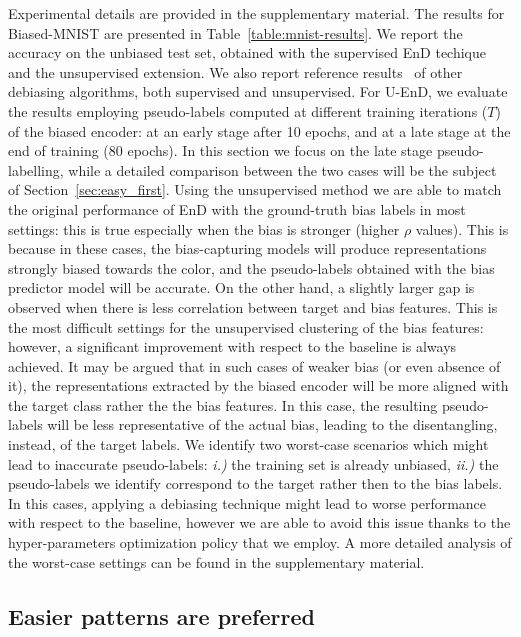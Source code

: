 Experimental details are provided in the supplementary material. %
The results for Biased-MNIST are presented in Table~\ref{table:mnist-results}. We report the accuracy on the unbiased test set, obtained with the supervised EnD techique and the unsupervised extension. We also report reference results~\cite{bahng2019rebias} of other debiasing algorithms, both supervised and unsupervised. 
For U-EnD, we evaluate the results employing pseudo-labels computed at different training iterations ($T$) of the biased encoder: at an early stage after 10 epochs, and at a late stage at the end of training (80 epochs). In this section we focus on the late stage pseudo-labelling, while a detailed comparison between the two cases will be the subject of Section~\ref{sec:easy_first}.
Using the unsupervised method we are able to match the original performance of EnD with the ground-truth bias labels in most settings: this is true especially when the bias is stronger (higher $\rho$ values). This is because in these cases, the bias-capturing models will produce representations strongly biased towards the color, and the pseudo-labels obtained with the bias predictor model will be accurate. On the other hand, a slightly larger gap is observed when there is less correlation between target and bias features. 
This is the most difficult settings for the unsupervised clustering of the bias features: however, a significant improvement with respect to the baseline is always achieved. 
It may be argued that in such cases of weaker bias (or even absence of it), the representations extracted by the biased encoder will be more aligned with the target class rather the the bias features. In this case, the resulting pseudo-labels will be less representative of the actual bias, leading to the disentangling, instead, of the target labels. We identify two worst-case scenarios which might lead to inaccurate pseudo-labels: \emph{i.)} the training set is already unbiased, \emph{ii.)} the pseudo-labels we identify correspond to the target rather then to the bias labels. In this cases, applying a debiasing technique might lead to worse performance with respect to the baseline, however we are able to avoid this issue thanks to the hyper-parameters optimization policy that we employ. A more detailed analysis of the worst-case settings can be found in the supplementary material. %



\subsection{Easier patterns are preferred}
\label{sec:theoretical-model}

